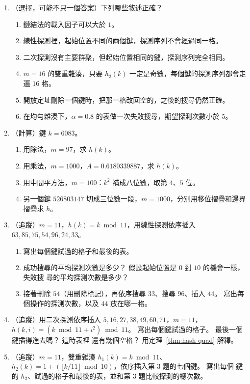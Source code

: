 \begin{enumerate}
\item （選擇，可能不只一個答案）下列哪些敘述正確？
\begin{enumerate}[nosep]
\item 鏈結法的載入因子可以大於 $1$。
\item 線性探測裡，起始位置不同的兩個鍵，探測序列不會經過同一格。
\item 二次探測沒有主要群聚，但起始位置相同的鍵，探測序列完全相同。
\item $m = 16$ 的雙重雜湊，只要 $h_2(k)$ 一定是奇數，每個鍵的探測序列都會走遍 $16$ 格。
\item 開放定址刪除一個鍵時，把那一格改回空的，之後的搜尋仍然正確。
\item 在均勻雜湊下，$\alpha = 0.8$ 的表做一次失敗搜尋，期望探測次數小於 $5$。
\end{enumerate}

\item （計算）鍵 $k = 6083$。
\begin{enumerate}[nosep]
\item 用除法，$m = 97$，求 $h(k)$。
\item 用乘法，$m = 1000$，$A = 0.6180339887$，求 $h(k)$。
\item 用中間平方法，$m = 100$：$k^2$ 補成八位數，取第 $4$、$5$ 位。
\item 另一個鍵 $526803147$ 切成三位數一段，$m = 1000$，分別用移位摺疊和邊界摺疊求
$h$。
\end{enumerate}

\item （追蹤）$m = 11$，$h(k) = k \bmod 11$，用線性探測依序插入
$63, 85, 75, 54, 96, 24, 33$。
\begin{enumerate}[nosep]
\item 寫出每個鍵試過的格子和最後的表。
\item 成功搜尋的平均探測次數是多少？ 假設起始位置是 $0$ 到 $10$ 的機會一樣，失敗搜
尋的平均探測次數是多少？
\item 接著刪除 $54$（用刪除標記），再依序搜尋 $33$、搜尋 $96$、插入 $44$。 寫出每
個操作的探測次數，以及 $44$ 放在哪一格。
\end{enumerate}

\item （追蹤）用二次探測依序插入 $5, 16, 27, 38, 49, 60, 71$，$m = 11$，
$h(k, i) = (k \bmod 11 + i^2) \bmod 11$。 寫出每個鍵試過的格子。 最後一個鍵插得進去嗎？ 這時表裡
還有幾個空格？ 用定理~\ref{thm:hash-quad} 解釋。

\item （追蹤）$m = 11$，雙重雜湊 $h_1(k) = k \bmod 11$、
$h_2(k) = 1 + (\lfloor k / 11 \rfloor \bmod 10)$，依序插入第 3 題的七個鍵。 寫出每個
鍵的 $h_2$、試過的格子和最後的表，並和第 3 題比較探測的總次數。


\end{enumerate}
